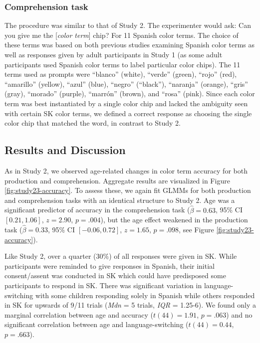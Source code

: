 \documentclass[
  ,apa7,floatsintext]{apa6}
\begin{document}
\hypertarget{comprehension-task-1}{%
\subsubsection{Comprehension task}\label{comprehension-task-1}}

The procedure was similar to that of Study 2. The experimenter would ask: Can you give me the {[}\emph{color term}{]} chip? For 11 Spanish color terms. The choice of these terms was based on both previous studies examining Spanish color terms as well as responses given by adult participants in Study 1 (as some adult participants used Spanish color terms to label particular color chips). The 11 terms used as prompts were ``blanco'' (white), ``verde'' (green), ``rojo'' (red), ``amarillo'' (yellow), ``azul'' (blue), ``negro'' (``black''), ``naranja'' (orange), ``gris'' (gray), ``morado'' (purple), ``marrón'' (brown), and ``rosa'' (pink). Since each color term was best instantiated by a single color chip and lacked the ambiguity seen with certain SK color terms, we defined a correct response as choosing the single color chip that matched the word, in contrast to Study 2.

\hypertarget{results-and-discussion-2}{%
\subsection{Results and Discussion}\label{results-and-discussion-2}}

As in Study 2, we observed age-related changes in color term accuracy for both production and comprehension. Aggregate results are visualized in Figure \ref{fig:study23-accuracy}. To assess these, we again fit GLMMs for both production and comprehension tasks with an identical structure to Study 2. Age was a significant predictor of accuracy in the comprehension task (\(\hat{\beta} = 0.63\), 95\% CI \([0.21, 1.06]\), \(z = 2.90\), \(p = .004\)), but the age effect weakened in the production task (\(\hat{\beta} = 0.33\), 95\% CI \([-0.06, 0.72]\), \(z = 1.65\), \(p = .098\), see Figure \ref{fig:study23-accuracy}).

Like Study 2, over a quarter (30\%) of all responses were given in SK. While participants were reminded to give responses in Spanish, their initial consent/assent was conducted in SK which could have predisposed some participants to respond in SK. There was significant variation in language-switching with some children responding solely in Spanish while others responded in SK for upwards of 9/11 trials (\emph{Mdn} = 5 trials, \emph{IQR} = 1.25-6). We found only a marginal correlation between age and accuracy (\(t(44) = 1.91\), \(p = .063\)) and no significant correlation between age and language-switching (\(t(44) = 0.44\), \(p = .663\)).
\end{document}
